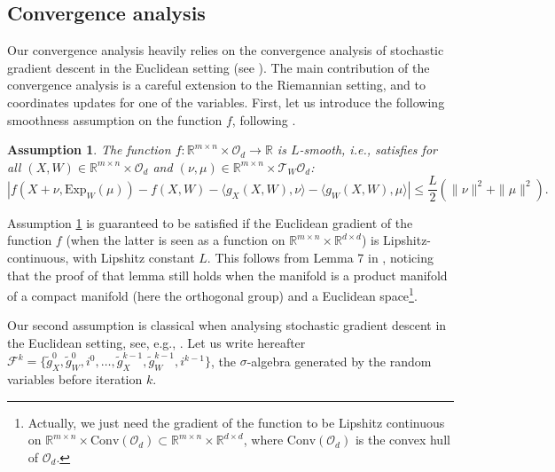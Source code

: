 \documentclass{article}
\def \R {\mathbb{R}}
\def \O {\mathcal{O}}
\def \T {\mathcal{T}}
\def \calF {\mathcal{F}}
\def \Exp {\mathrm{Exp}}
\newtheorem{assumption}{Assumption}
\begin{document}
\subsection{Convergence analysis} \label{sec:convergence}
Our convergence analysis heavily relies on the convergence analysis of stochastic gradient descent in the Euclidean setting (see \cite[Chap. 4]{Bottou2018}). The main contribution of the convergence analysis is a careful extension to the Riemannian setting, and to coordinates updates for one of the variables. First, let us introduce the following smoothness assumption on the function $f$, following \cite{Boumal2018}. 

\begin{assumption} \label{ass:smooth}
The function $f : \R^{m \times n} \times \O_d \to \R$ is $L$-smooth, i.e., satisfies for all $(X,W) \in \R^{m \times n} \times \O_d$ and $(\nu, \mu) \in \R^{m \times n} \times \T_{W}\O_d$:
\[ \left| f(X+\nu,\Exp_{W}(\mu)) - f(X,W) - \langle g_X(X,W), \nu \rangle  - \langle g_W(X,W), \mu \rangle \right| \leq \frac{L}{2} \left( \|\nu\|^2 + \| \mu \|^2\right). \]
\end{assumption}

Assumption \ref{ass:smooth} is guaranteed to be satisfied if the Euclidean gradient of the function $f$ (when the latter is seen as a function on $\R^{m \times n} \times \R^{d \times d}$) is Lipshitz-continuous, with Lipshitz constant $L$. This follows from Lemma 7 in \cite{Boumal2018}, noticing that the proof of that lemma still holds when the manifold is a product manifold of a compact manifold (here the orthogonal group) and a Euclidean space\footnote{Actually, we just need the gradient of the function to be Lipshitz continuous on $\R^{m \times n} \times \mathrm{Conv}(\mathcal{O}_d) \subset \R^{m \times n} \times \R^{d \times d}$, where $\mathrm{Conv}(\mathcal{O}_d)$ is the convex hull of $\O_d$.}.

Our second assumption is classical when analysing stochastic gradient descent in the Euclidean setting, see, e.g., \cite[Chap. 4]{Bottou2018}. Let us write hereafter $\calF^k = \{ \tilde g_X^0, \tilde g_W^0, i^0, \dots, \tilde g_X^{k-1}, \tilde g_W^{k-1}, i^{k-1}\}$, the $\sigma$-algebra generated by the random variables before iteration $k$.
\end{document}
